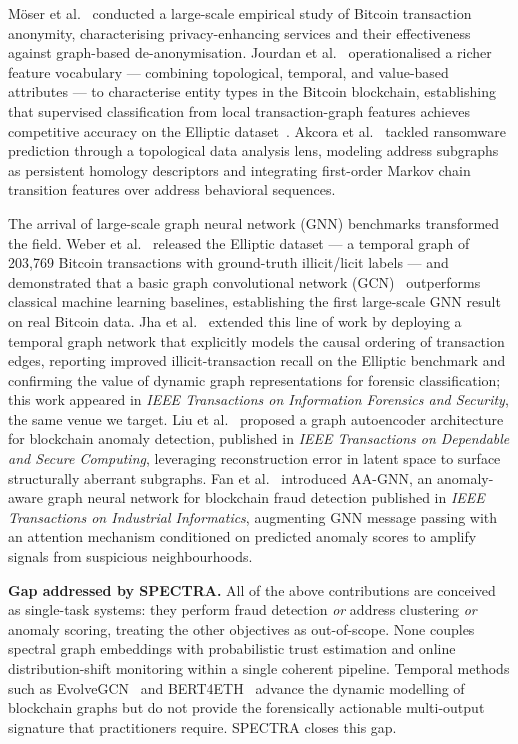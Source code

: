 M\"{o}ser et al.~\cite{Moser2017} conducted a large-scale empirical study of
Bitcoin transaction anonymity, characterising privacy-enhancing services and
their effectiveness against graph-based de-anonymisation.  Jourdan et
al.~\cite{Jourdan2019} operationalised a richer feature vocabulary --- combining
topological, temporal, and value-based attributes --- to characterise entity
types in the Bitcoin blockchain, establishing that supervised classification
from local transaction-graph features achieves competitive accuracy on the
Elliptic dataset~\cite{Weber2019}.  Akcora et al.~\cite{Akcora2022} tackled
ransomware prediction through a topological data analysis lens, modeling address
subgraphs as persistent homology descriptors and integrating first-order Markov
chain transition features over address behavioral sequences.

The arrival of large-scale graph neural network (GNN) benchmarks transformed
the field.  Weber et al.~\cite{Weber2019} released the Elliptic dataset --- a
temporal graph of 203,769 Bitcoin transactions with ground-truth illicit/licit
labels --- and demonstrated that a basic graph convolutional network
(GCN)~\cite{Kipf2017} outperforms classical machine learning baselines,
establishing the first large-scale GNN result on real Bitcoin data.  Jha et
al.~\cite{Jha2023} extended this line of work by deploying a temporal graph
network that explicitly models the causal ordering of transaction edges,
reporting improved illicit-transaction recall on the Elliptic benchmark and
confirming the value of dynamic graph representations for forensic
classification; this work appeared in \emph{IEEE Transactions on Information
Forensics and Security}, the same venue we target.  Liu et al.~\cite{Liu2024}
proposed a graph autoencoder architecture for blockchain anomaly detection,
published in \emph{IEEE Transactions on Dependable and Secure Computing},
leveraging reconstruction error in latent space to surface structurally
aberrant subgraphs.  Fan et al.~\cite{Fan2024} introduced AA-GNN, an
anomaly-aware graph neural network for blockchain fraud detection published in
\emph{IEEE Transactions on Industrial Informatics}, augmenting GNN message
passing with an attention mechanism conditioned on predicted anomaly scores to
amplify signals from suspicious neighbourhoods.

\smallskip
\noindent\textbf{Gap addressed by SPECTRA.}
All of the above contributions are conceived as single-task systems: they
perform fraud detection \emph{or} address clustering \emph{or} anomaly scoring,
treating the other objectives as out-of-scope.  None couples spectral graph
embeddings with probabilistic trust estimation and online distribution-shift
monitoring within a single coherent pipeline.  Temporal methods such as
EvolveGCN~\cite{Pareja2020} and BERT4ETH~\cite{He2023} advance the dynamic
modelling of blockchain graphs but do not provide the forensically actionable
multi-output signature that practitioners require.  SPECTRA closes this gap.

